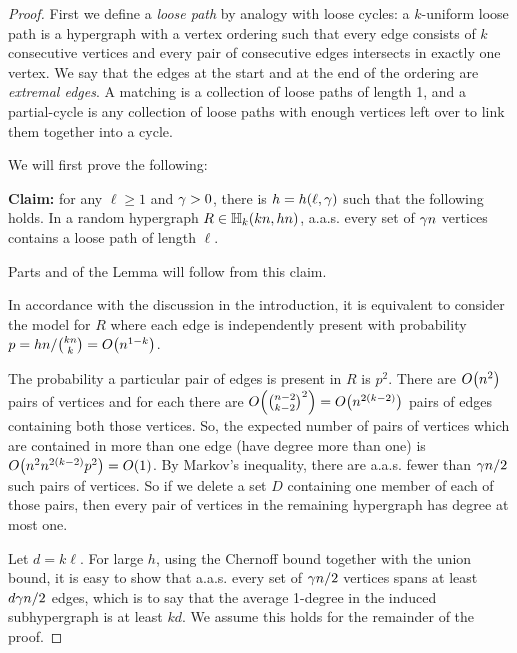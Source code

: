 \documentclass[11pt,english]{article}
\theoremstyle{plain}
\theoremstyle{definition}
\theoremstyle{definition}
\theoremstyle{plain}
\theoremstyle{plain}
\theoremstyle{plain}
\theoremstyle{plain}
\theoremstyle{remark}
\theoremstyle{remark}
\let\originalleft\left
\let\originalright\right
\renewcommand{\left}{\mathopen{}\mathclose\bgroup\originalleft}
\renewcommand{\right}{\aftergroup\egroup\originalright}
\begin{document}
\begin{proof}
First we define a \emph{loose path} by analogy with loose cycles:
a $k$-uniform loose path is a hypergraph with a vertex ordering such
that every edge consists of $k$ consecutive vertices and every pair
of consecutive edges intersects in exactly one vertex. We say that the edges at the start and at the end of the ordering are \emph{extremal edges}. A matching
is a collection of loose paths of length 1, and a partial-cycle is any
collection of loose paths with enough vertices left over to link them
together into a cycle.

We will first prove the following:

\textbf{Claim:} for any $\ell\ge1$ and $\gamma>0$, there
is $h=h\left(\ell,\patheps\right)$ such that the following holds. In a
random hypergraph $R\in\HH_{k}\left(kn,hn\right)$,
a.a.s.{} every set of $\gamma n$ vertices contains a loose path of length
$\ell$.

Parts  and  of the Lemma will follow from this claim.

In accordance with the discussion in the introduction, it is equivalent to consider
the model for $R$ where each edge is independently present with probability
$p=hn/{kn \choose k}=O\left(n^{1-k}\right)$.

The probability a particular pair of edges is present in $R$ is $p^2$. There are $O\left(n^2\right)$ pairs of vertices and for each there are $O\left({n-2\choose k-2}^2\right)=
O\left(n^{2\left(k-2\right)}\right)$ pairs of edges containing both those vertices. So, the expected number of pairs of vertices
which are contained in more than one edge (have degree more than one)
is $O\left(n^2n^{2\left(k-2\right)}p^2\right)=O\left(1\right)$. By Markov's inequality, there are a.a.s.{} fewer
than $\gamma n/2$ such pairs of vertices. So if we delete a
set $D$ containing one member of each of those pairs, then every pair of vertices in the remaining hypergraph has
degree at most one.

Let $d=k\ell$. For
large $h$, using the Chernoff bound together with the union
bound, it is easy to show that a.a.s.{} every set of $\gamma n/2$ vertices spans at least $d\gamma n/2$
edges, which is to say that the average 1-degree in the induced subhypergraph
is at least $kd$. We assume this holds for the remainder of the proof.


\end{proof}
\end{document}
